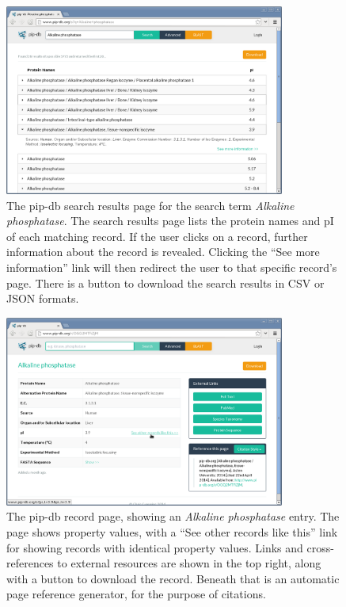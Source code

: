 \begin{figure}[H]
\centering
    \includegraphics[width=0.82\textwidth]{assets/pip-db-results}
\caption[pip-db results page]
        {The pip-db search results page for the search term
          \textit{Alkaline phosphatase}. The search results page lists
          the protein names and pI of each matching record. If the
          user clicks on a record, further information about the
          record is revealed. Clicking the ``See more information''
          link will then redirect the user to that specific record's
          page. There is a button to download the search results in
          CSV or JSON formats.}
\label{fig:pip-db-results}
\end{figure}


\begin{figure}[H]
\centering
    \includegraphics[width=0.82\textwidth]{assets/pip-db-record}
\caption[pip-db record page]
        {The pip-db record page, showing an \textit{Alkaline
            phosphatase} entry. The page shows property values, with a
          ``See other records like this'' link for showing records
          with identical property values. Links and cross-references
          to external resources are shown in the top right, along with
          a button to download the record. Beneath that is an
          automatic page reference generator, for the purpose of
          citations.}
\label{fig:pip-db-record}
\end{figure}



